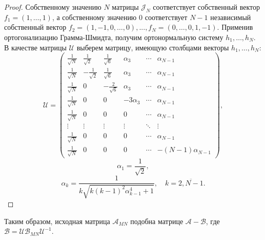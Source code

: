 \begin{proof}
    Собственному значению \( N \) матрицы \( \mathcal{J}_N \) 
    соответствует собственный вектор \( f_1 = {\left(1,\ldots,1\right)} \),
        а собственному значению \( 0 \) соответствует \( N-1 \) независимый собственный вектор
        \( f_2 = {\left(1,-1,0,\ldots,0\right)}, ...,
           f_N = {\left(0,\ldots,0,1,-1\right)} \).
    Применив ортогонализацию Грамма-Шмидта, получим ортонормальную систему \( h_1, \ldots, h_N \).
    В качестве матрицы \( \mathcal{U} \) выберем матрицу,
    имеющую столбцами векторы \( h_1, \ldots, h_N \):
    \[ \mathcal{U} =
    \begin{pmatrix}
        \frac{1}{\sqrt N} &  \frac{1}{\sqrt2} &  \frac{1}{\sqrt{6}} &   \alpha_3 & \cdots & \alpha_{N-1} \\
        \frac{1}{\sqrt N} & -\frac{1}{\sqrt2} &  \frac{1}{\sqrt{6}} &   \alpha_3 & \cdots & \alpha_{N-1} \\
        \frac{1}{\sqrt N} & 0                 & -\frac{2}{\sqrt{6}} &   \alpha_3 & \cdots & \alpha_{N-1} \\
        \frac{1}{\sqrt N} & 0                 &  0                  & -3\alpha_3 & \cdots & \alpha_{N-1} \\
        \frac{1}{\sqrt N} & 0                 &  0                  & 0          & \cdots & \alpha_{N-1} \\
        \vdots    & \vdots            &  \vdots             & \vdots     & \ddots & \vdots  \\
        \frac{1}{\sqrt N} & 0                 &  0                  & 0          & \cdots & \alpha_{N-1} \\
        \frac{1}{\sqrt N} & 0                 &  0                  & 0          & \cdots & -(N-1)\alpha_{N-1}
    \end{pmatrix},\]
    \[
        \alpha_1 = \frac{1}{\sqrt{2}}, \]
    \[
        \alpha_k = \frac{1}{k\sqrt{k(k-1)^2 \alpha_{k-1}^4 + 1}}, \quad k=\overline{2,N-1}.\]
\end{proof}

Таким образом, исходная матрица \( \mathcal{A}_{MN} \) подобна матрице
\( \mathcal{A} - \mathcal{B} \), где \( \mathcal{B} = \mathcal{U} \mathscr{B}_{MN} \mathcal{U}^{-1} \).
